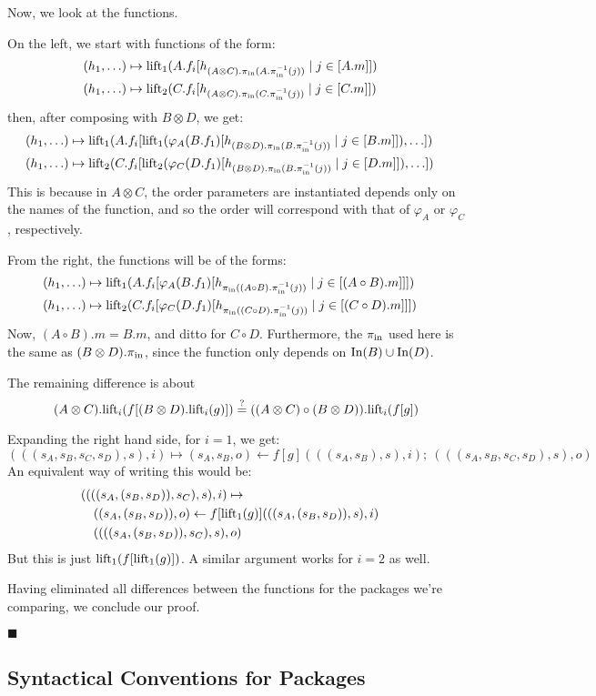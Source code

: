 \begin{lemma}
    Now, we look at the functions.

    On the left, we start with functions of the form:
    $$
    \begin{aligned}
    &(h_1, \ldots) \mapsto
    \text{lift}_1(A.f_i[h_{(A \otimes C).\pi_{\text{in}}(A.\pi_{\text{in}}^{-1}(j))}\mid j \in [A.m]])\cr
    &(h_1, \ldots) \mapsto
    \text{lift}_2(C.f_i[h_{(A \otimes C).\pi_{\text{in}}(C.\pi_{\text{in}}^{-1}(j))}\mid j \in [C.m]])\cr
    \end{aligned}
    $$
    then, after composing with $B \otimes D$, we get:
    $$
    \begin{aligned}
    &(h_1, \ldots) \mapsto
    \text{lift}_1(A.f_i[\text{lift}_1(\varphi_{A}(B.f_1)[h_{(B \otimes D).\pi_{\text{in}}(B.\pi_{\text{in}}^{-1}(j))}\mid j \in [B.m]]), \ldots])\cr
    &(h_1, \ldots) \mapsto
    \text{lift}_2(C.f_i[\text{lift}_2(\varphi_{C}(D.f_1)[h_{(B \otimes D).\pi_{\text{in}}(B.\pi_{\text{in}}^{-1}(j))}\mid j \in [D.m]]), \ldots])\cr
    \end{aligned}
    $$
    This is because in $A \otimes C$, the order parameters are instantiated
    depends only on the names of the function, and so the order
    will correspond with that of $\varphi_A$ or $\varphi_C$, respectively.

    From the right, the functions will be of the forms:
    $$
    \begin{aligned}
    &(h_1, \ldots) \mapsto \text{lift}_1(A.f_i[\varphi_A(B.f_1)[h_{\pi_{\text{in}}((A \circ B).\pi_{\text{in}}^{-1}(j))}\mid j \in [(A \circ B).m]]])\cr
    &(h_1, \ldots) \mapsto \text{lift}_2(C.f_i[\varphi_C(D.f_1)[h_{\pi_{\text{in}}((C \circ D).\pi_{\text{in}}^{-1}(j))}\mid j \in [(C \circ D).m]]])\cr
    \end{aligned}
    $$
    Now, $(A \circ B).m = B.m$, and ditto for $C \circ D$.
    Furthermore, the $\pi_{\text{in}}$ used here is the same as $(B \otimes D).\pi_{\text{in}}$,
    since the function only depends on $\text{In}(B) \cup \text{In}(D)$.

    The remaining difference is about
    $$
    (A \otimes C).\text{lift}_i(f[(B \otimes D).\text{lift}_i(g)])
    \stackrel{?}{=}
    ((A \otimes C) \circ (B \otimes D)).\text{lift}_i(f[g])
    $$

    Expanding the right hand side, for $i = 1$, we get:
    $$
    (((s_A, s_B, s_C, s_D), s), i) \mapsto (s_A, s_B, o) \gets f[g](((s_A, s_B), s), i);\ (((s_A, s_B, s_C, s_D), s), o)
    $$
    An equivalent way of writing this would be:
    $$
    \begin{aligned}
    &((((s_A, (s_B, s_D)), s_C), s), i) \mapsto\cr
    &\quad ((s_A, (s_B, s_D)), o) \gets f[\text{lift}_1(g)](((s_A, (s_B, s_D)), s), i)\cr
    &\quad ((((s_A, (s_B, s_D)), s_C), s), o)
    \end{aligned}
    $$
    But this is just $\text{lift}_1(f[\text{lift}_1(g)])$.
    A similar argument works for $i = 2$ as well.

    Having eliminated all differences between the functions for the packages
    we're comparing, we conclude our proof.

    $\blacksquare$
\end{lemma}

\subsection{Syntactical Conventions for Packages}